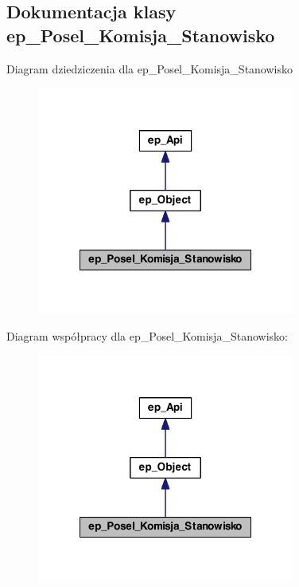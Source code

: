 \hypertarget{classep___posel___komisja___stanowisko}{\subsection{Dokumentacja klasy ep\-\_\-\-Posel\-\_\-\-Komisja\-\_\-\-Stanowisko}
\label{classep___posel___komisja___stanowisko}
}


Diagram dziedziczenia dla ep\-\_\-\-Posel\-\_\-\-Komisja\-\_\-\-Stanowisko\nopagebreak
\begin{figure}[H]
\begin{center}
\leavevmode
\includegraphics[width=240pt]{classep___posel___komisja___stanowisko__inherit__graph}
\end{center}
\end{figure}


Diagram współpracy dla ep\-\_\-\-Posel\-\_\-\-Komisja\-\_\-\-Stanowisko\-:\nopagebreak
\begin{figure}[H]
\begin{center}
\leavevmode
\includegraphics[width=240pt]{classep___posel___komisja___stanowisko__coll__graph}
\end{center}
\end{figure}

